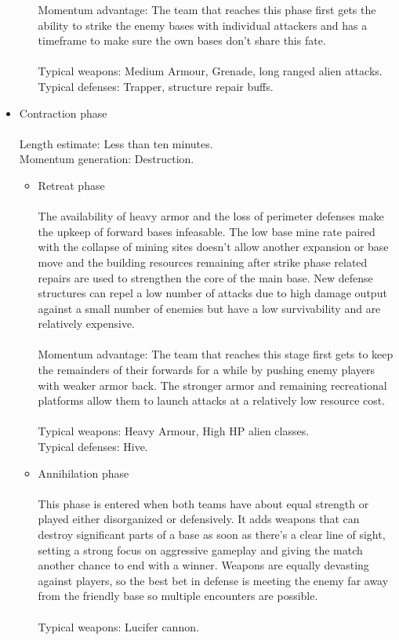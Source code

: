 \documentclass{scrartcl}
\begin{document}
\begin{itemize}
\begin{itemize}
			Momentum advantage: The team that reaches this phase first gets the ability to strike the enemy bases with individual attackers and has a timeframe to make sure the own bases don't share this fate. \\\\
			Typical weapons: Medium Armour, Grenade, long ranged alien attacks. \\
			Typical defenses: Trapper, structure repair buffs. \\
		\end{itemize}
	\item Contraction phase \\\\
		Length estimate: Less than ten minutes. \\
		Momentum generation: Destruction. \\
		\begin{itemize}
		\item Retreat phase \\\\
			The availability of heavy armor and the loss of perimeter defenses make the upkeep of forward bases infeasable. The low base mine rate paired with the collapse of mining sites doesn't allow another expansion or base move and the building resources remaining after strike phase related repairs are used to strengthen the core of the main base. New defense structures can repel a low number of attacks due to high damage output against a small number of enemies but have a low survivability and are relatively expensive. \\\\
			Momentum advantage: The team that reaches this stage first gets to keep the remainders of their forwards for a while by pushing enemy players with weaker armor back. The stronger armor and remaining recreational platforms allow them to launch attacks at a relatively low resource cost. \\\\
			Typical weapons: Heavy Armour, High HP alien classes. \\
			Typical defenses: Hive. \\
		\item Annihilation phase \\\\
			This phase is entered when both teams have about equal strength or played either disorganized or defensively. It adds weapons that can destroy significant parts of a base as soon as there's a clear line of sight, setting a strong focus on aggressive gameplay and giving the match another chance to end with a winner. Weapons are equally devasting against players, so the best bet in defense is meeting the enemy far away from the friendly base so multiple encounters are possible. \\\\
			Typical weapons: Lucifer cannon. \\
		\end{itemize}
\end{itemize}
\end{document}
